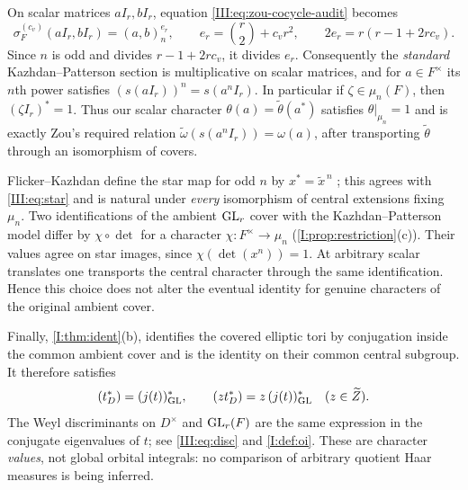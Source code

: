 On scalar matrices $aI_r,bI_r$, equation
\eqref{III:eq:zou-cocycle-audit} becomes
\begin{equation}\label{III:eq:scalar-audit}
 \sigma_F^{(c_v)}(aI_r,bI_r)=(a,b)_n^{e_r},
 \qquad e_r=\binom r2+c_vr^2,
 \qquad 2e_r=r(r-1+2rc_v).
\end{equation}
Since $n$ is odd and divides $r-1+2rc_v$, it divides $e_r$.
Consequently the \emph{standard} Kazhdan--Patterson section is
multiplicative on scalar matrices, and for $a\in F^\times$ its
$n$th power satisfies $(s(aI_r))^n=s(a^n I_r)$.
In particular if $\zeta\in\mu_n(F)$, then $(\zeta I_r)^*=1$.
Thus our scalar character
$\theta(a)=\widetilde\theta(a^*)$ satisfies
$\theta|_{\mu_n}=1$ and is exactly Zou's required relation
$\widetilde\omega(s(a^nI_r))=\omega(a)$, after transporting
$\widetilde\theta$ through an isomorphism of covers.

Flicker--Kazhdan define the star map for odd $n$ by
$x^*=\widetilde x^{\,n}$ \cite[\S4]{FK86}; this agrees with
\eqref{III:eq:star} and is natural under \emph{every} isomorphism of
central extensions fixing $\mu_n$.  Two identifications of the
ambient $\operatorname{GL}_r$ cover with the Kazhdan--Patterson model differ
by $\chi\circ\det$ for a character $\chi:F^\times\to\mu_n$
(\cref{I:prop:restriction}(c)).  Their values agree on star images,
since $\chi(\det(x^n))=1$.  At arbitrary scalar translates one
transports the central character through the same identification.
Hence this choice does not alter the eventual identity for genuine
characters of the original ambient cover.

Finally, \cref{I:thm:ident}(b), identifies the covered elliptic
tori by conjugation inside the common ambient cover and is the
identity on their common central subgroup.  It therefore satisfies
\begin{equation}\label{III:eq:jstar-audit}
 \relax(t_D^*)=(j(t))_{\operatorname{GL}}^*,\qquad
 \relax(z t_D^*)=z\,(j(t))_{\operatorname{GL}}^*
 \quad(z\in\widetilde Z).
\end{equation}
The Weyl discriminants on $D^\times$ and $\operatorname{GL}_r(F)$ are the same
expression in the conjugate eigenvalues of $t$; see
\eqref{III:eq:disc} and \cref{I:def:oi}.
These are character \emph{values}, not global orbital integrals:
no comparison of arbitrary quotient Haar measures is being inferred.

